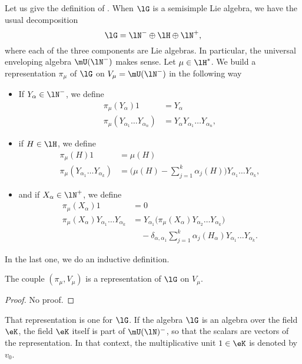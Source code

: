 Let us give the definition of \cite{VermaPiercey}. When $\lG$ is a semisimple Lie algebra, we have the usual decomposition
\begin{equation}
    \lG=\lN^-\oplus\lH\oplus\lN^+,
\end{equation}
where each of the three components are Lie algebras. In particular, the universal enveloping algebra $\mU(\lN^-)$ makes sense. Let $\mu\in\lH^*$. We build a representation $\pi_{\mu}$ of $\lG$ on $V_{\mu}=\mU(\lN^-)$ in the following way
\begin{itemize}
\item If $Y_{\alpha}\in\lN^-$, we define
\begin{subequations}
    \begin{align}
        \pi_{\mu}(Y_{\alpha})1  &=Y_{\alpha}\\
        \pi_{\mu}(Y_{\alpha_1}\ldots Y_{\alpha_n})&=Y_{\alpha}Y_{\alpha_1}\ldots Y_{\alpha_n},
    \end{align}
\end{subequations}
\item if $H\in\lH$, we define
\begin{subequations}
    \begin{align}
        \pi_{\mu}(H)1   &=\mu(H)\\
        \pi_{\mu}(Y_{\alpha_1}\ldots Y_{\alpha_k})  &= \big( \mu(H)-\sum_{j=1}^k\alpha_j(H) \big)Y_{\alpha_1}\ldots Y_{\alpha_k},
    \end{align}
\end{subequations}
\item and if $X_{\alpha}\in\lN^+$, we define
\begin{subequations}
    \begin{align}
        \pi_{\mu}(X_{\alpha})1  &=0\\
        \pi_{\mu}(X_{\alpha})Y_{\alpha_1}\ldots Y_{\alpha_k}    &=Y_{\alpha_1}\big( \pi_{\mu}(X_{\alpha})Y_{\alpha_2}\ldots Y_{\alpha_k} \big)\\
                                    &\quad  -\delta_{\alpha,\alpha_1}\sum_{j=1}^k\alpha_j(H_{\alpha})Y_{\alpha_1}\ldots Y_{\alpha_k}.
    \end{align}
\end{subequations}
\end{itemize}
In the last one, we do an inductive definition. 
\begin{lemma}
The couple $(\pi_{\mu},V_{\mu})$ is a representation of $\lG$ on $V_{\mu}$.
\end{lemma}
\begin{proof}
    No proof.
\end{proof}
That representation is one  for $\lG$. If the algebra $\lG$ is an algebra over the field $\eK$, the field $\eK$ itself is part of $\mU(\lN)^-$, so that the scalars are vectors of the representation. In that context, the multiplicative unit $1\in \eK$ is denoted by $v_0$.

